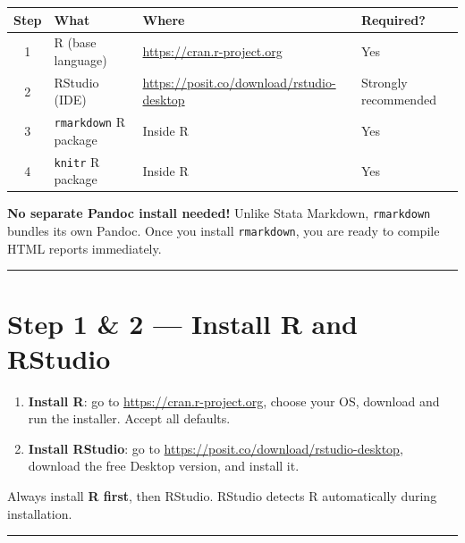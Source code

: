 \documentclass[paper=a4, fontsize=11pt]{scrartcl}
\newcommand{\horrule}[1]{\rule{\linewidth}{#1}}
\begin{document}
\begin{center}
\begin{tabular}{clll}
\toprule
\textbf{Step} & \textbf{What} & \textbf{Where} & \textbf{Required?} \\
\midrule
1 & R (base language) & \url{https://cran.r-project.org} & Yes \\
2 & RStudio (IDE)     & \url{https://posit.co/download/rstudio-desktop} & Strongly recommended \\
3 & \texttt{rmarkdown} R package & Inside R & Yes \\
4 & \texttt{knitr} R package     & Inside R & Yes \\
\bottomrule
\end{tabular}
\end{center}

\begin{tipbox}
\textbf{No separate Pandoc install needed!} Unlike Stata Markdown,
\texttt{rmarkdown} bundles its own Pandoc. Once you install \texttt{rmarkdown},
you are ready to compile HTML reports immediately.
\end{tipbox}

\bigskip\horrule{0.4pt}\bigskip

\section{Step 1 \& 2 --- Install R and RStudio}

\begin{enumerate}
  \item \textbf{Install R}: go to \url{https://cran.r-project.org}, choose your OS,
        download and run the installer. Accept all defaults.
  \item \textbf{Install RStudio}: go to \url{https://posit.co/download/rstudio-desktop},
        download the free Desktop version, and install it.
\end{enumerate}

\begin{tipbox}
Always install \textbf{R first}, then RStudio. RStudio detects R automatically during
installation.
\end{tipbox}

\bigskip\horrule{0.4pt}\bigskip

\end{document}
